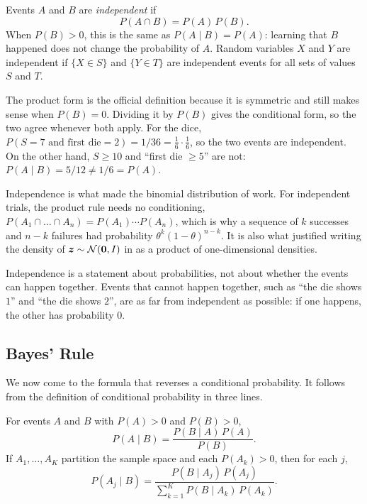 \begin{definition}[Independence]
  \label{def:independence}
  Events $A$ and $B$ are \emph{independent} if
  \[
    P(A \cap B) = P(A)\, P(B) .
  \]
  When $P(B) > 0$, this is the same as $P(A \mid B) = P(A)$: learning
  that $B$ happened does not change the probability of $A$. Random
  variables $X$ and $Y$ are independent if $\{X \in S\}$ and $\{Y \in
  T\}$ are independent events for all sets of values $S$ and $T$.
\end{definition}

The product form is the official definition because it is symmetric
and still makes sense when $P(B) = 0$. Dividing it by $P(B)$ gives the
conditional form, so the two agree whenever both apply. For the dice,
$P(S = 7 \text{ and first die} = 2) = 1/36 = \frac16 \cdot \frac16$,
so the two events are independent. On the other hand, $S \ge 10$ and
``first die $\ge 5$'' are not: $P(A \mid B) = 5/12 \ne 1/6 = P(A)$.

Independence is what made the binomial distribution of
 work. For independent trials, the product rule
needs no conditioning, $P(A_1 \cap \dots \cap A_n) = P(A_1) \cdots
P(A_n)$, which is why a sequence of $k$ successes and $n - k$ failures
had probability $\theta^k(1 - \theta)^{n - k}$. It is also what
justified writing the density of $\bm{z} \sim \mathcal{N}(\bm{0}, I)$
in  as a product of one-dimensional densities.

\begin{note}
  Independence is a statement about probabilities, not about whether
  the events can happen together. Events that cannot happen together,
  such as ``the die shows $1$'' and ``the die shows $2$'', are as far
  from independent as possible: if one happens, the other has
  probability $0$.
\end{note}

\subsection{Bayes' Rule}
\label{sec:ch05-bayes-rule}

We now come to the formula that reverses a conditional probability.
It follows from the definition of conditional probability in three
lines.

\begin{theorem}
  \label{thm:bayes}
  For events $A$ and $B$ with $P(A) > 0$ and $P(B) > 0$,
  \[
    P(A \mid B) = \frac{P(B \mid A)\, P(A)}{P(B)} .
  \]
  If $A_1, \dots, A_K$ partition the sample space and each $P(A_k) > 0$,
  then for each $j$,
  \[
    P(A_j \mid B)
    = \frac{P(B \mid A_j)\, P(A_j)}{\sum_{k=1}^{K} P(B \mid A_k)\, P(A_k)} .
  \]
\end{theorem}

